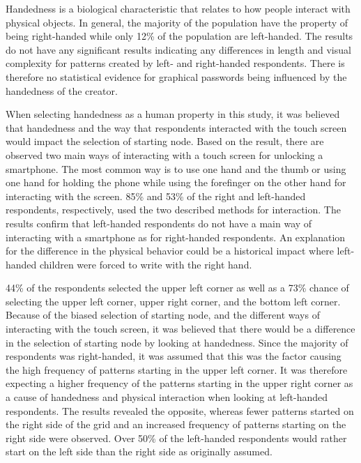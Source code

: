     Handedness is a biological characteristic that relates to how people interact with physical objects. In general, the majority of the population have the property of being right-handed while only 12\% of the population are left-handed. The results do not have any significant results indicating any differences in length and visual complexity for patterns created by left- and right-handed respondents. There is therefore no statistical evidence for graphical passwords being influenced by the handedness of the creator.

    When selecting handedness as a human property in this study, it was believed that handedness and the way that respondents interacted with the touch screen would impact the selection of starting node. Based on the result, there are observed two main ways of interacting with a touch screen for unlocking a smartphone. The most common way is to use one hand and the thumb or using one hand for holding the phone while using the forefinger on the other hand for interacting with the screen. 85\% and 53\% of the right and left-handed respondents, respectively, used the two described methods for interaction. The results confirm that left-handed respondents do not have a main way of interacting with a smartphone as for right-handed respondents. An explanation for the difference in the physical behavior could be a historical impact where left-handed children were forced to write with the right hand.

    44\% of the respondents selected the upper left corner as well as a 73\% chance of selecting the upper left corner, upper right corner, and the bottom left corner. Because of the biased selection of starting node, and the different ways of interacting with the touch screen, it was believed that there would be a difference in the selection of starting node by looking at handedness. Since the majority of respondents was right-handed, it was assumed that this was the factor causing the high frequency of patterns starting in the upper left corner. It was therefore expecting a higher frequency of the patterns starting in the upper right corner as a cause of handedness and physical interaction when looking at left-handed respondents. The results revealed the opposite, whereas fewer patterns started on the right side of the grid and an increased frequency of patterns starting on the right side were observed. Over 50\% of the left-handed respondents would rather start on the left side than the right side as originally assumed.  

